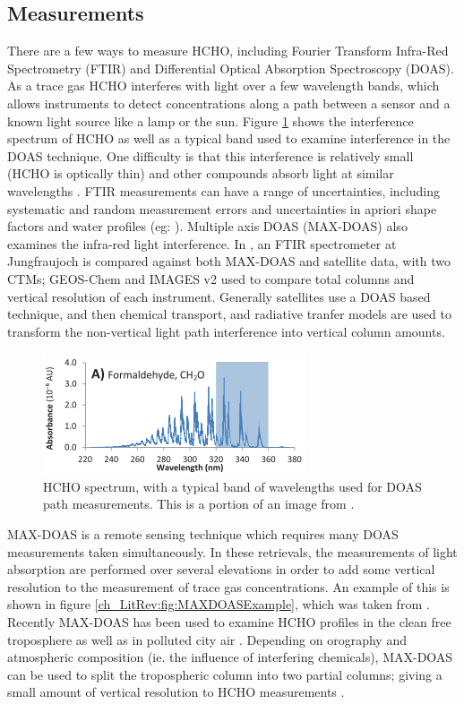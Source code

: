  \subsection{Measurements}
    There are a few ways to measure HCHO, including Fourier Transform Infra-Red Spectrometry (FTIR) and Differential Optical Absorption Spectroscopy (DOAS).
    As a trace gas HCHO interferes with light over a few wavelength bands, which allows instruments to detect concentrations along a path between a sensor and a known light source like a lamp or the sun.
    Figure \ref{ch_LitRev:fig:HCHOSpectrum} shows the interference spectrum of HCHO as well as a typical band used to examine interference in the DOAS technique.
    One difficulty is that this interference is relatively small (HCHO is optically thin) and other compounds absorb light at similar wavelengths \citep{Davenport2015}.
    FTIR measurements can have a range of uncertainties, including systematic and random measurement errors and uncertainties in apriori shape factors and water profiles (eg: \citet{Franco2015}).
    Multiple axis DOAS (MAX-DOAS) also examines the infra-red light interference.
    In \citet{Franco2015}, an FTIR spectrometer at Jungfraujoch is compared against both MAX-DOAS and satellite data, with two CTMs; GEOS-Chem and IMAGES v2 used to compare total columns and vertical resolution of each instrument.
    Generally satellites use a DOAS based technique, and then chemical transport, and radiative tranfer models are used to transform the non-vertical light path interference into vertical column amounts.
    
    \begin{figure}
      \includegraphics{Figures/HCHO/HCHOAbsorbanceDavenport.png}
      \caption{ HCHO spectrum, with a typical band of wavelengths used for DOAS path measurements.
	This is a portion of an image from \citet{Davenport2015}.}
      \label{ch_LitRev:fig:HCHOSpectrum}
    \end{figure}
    
    MAX-DOAS is a remote sensing technique which requires many DOAS measurements taken simultaneously.
    In these retrievals, the measurements of light absorption are performed over several elevations in order to add some vertical resolution to the measurement of trace gas concentrations.
    An example of this is shown in figure \ref{ch_LitRev:fig:MAXDOASExample}, which was taken from \citet{Lee2015}.
    Recently MAX-DOAS has been used to examine HCHO profiles in the clean free troposphere \citep{Franco2015, Schreier2016} as well as in polluted city air \citep{Lee2015}.
    Depending on orography and atmospheric composition (ie. the influence of interfering chemicals), MAX-DOAS can be used to split the tropospheric column into two partial columns; giving a small amount of vertical resolution to HCHO measurements \citep[eg.]{Franco2015, Lee2015}.
    
